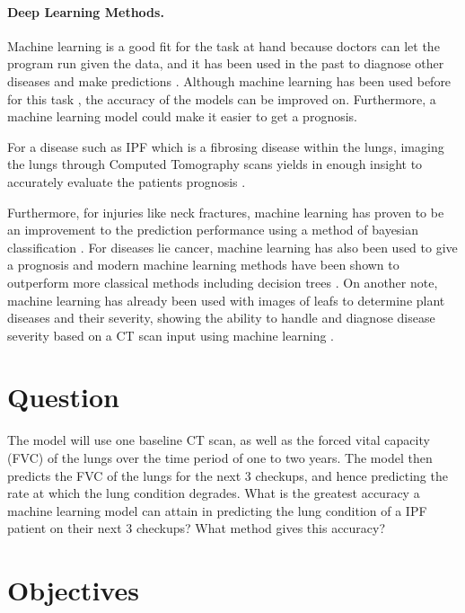 \documentclass[12pt]{article}
\begin{document}
\paragraph*{Deep Learning Methods.}

Machine learning is a good fit for the task at hand because doctors can let the program run given the data, and it has been used in the past to diagnose other diseases and make predictions \cite{wang2010high}. 
Although machine learning has been used before for this task \cite{robbie2017evaluating,du20146,maldonado2014automated}, the accuracy of the models can be improved on.
Furthermore, a machine learning model could make it easier to get a prognosis.

For a disease such as IPF which is a fibrosing disease within the lungs, imaging the lungs through Computed Tomography scans yields in enough insight to accurately evaluate the patients prognosis \cite{walsh2018role}.

Furthermore, for injuries like neck fractures, machine learning has proven to be an improvement to the prediction performance using a method of bayesian classification \cite{kukar1996machine}.
For diseases lie cancer, machine learning has also been used to give a prognosis and modern machine learning methods have been shown to outperform more classical methods including decision trees \cite{cruz2006applications}.
On another note, machine learning has already been used with images of leafs to determine plant diseases and their severity, showing the ability to handle and diagnose disease severity based on a CT scan input using machine learning \cite{mwebaze2016machine}.

\section*{Question}

The model will use one baseline CT scan, as well as the forced vital capacity (FVC) of the lungs over the time period of one to two years.
The model then predicts the FVC of the lungs for the next 3 checkups, and hence predicting the rate at which the lung condition degrades. 
What is the greatest accuracy a machine learning model can attain in predicting the lung condition of a IPF patient on their next 3 checkups?  
What method gives this accuracy?

\section*{Objectives}
\end{document}
